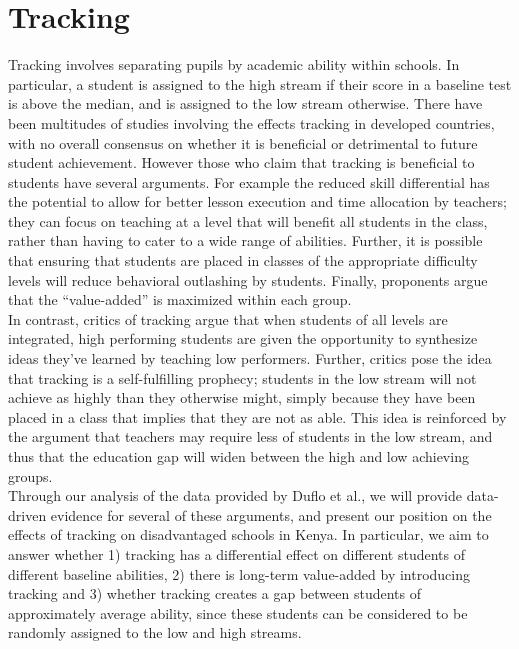 \documentclass[11pt]{article}
\begin{document}
\section{Tracking}
Tracking involves separating pupils by academic ability within schools. In particular, a student is assigned to the high stream if their score in a baseline test is above the median, and is assigned to the low stream otherwise. There have been multitudes of studies involving the effects tracking in developed countries, with no overall consensus on whether it is beneficial or detrimental to future student achievement. However those who claim that tracking is beneficial to students have several arguments. For example the reduced skill differential has the potential to allow for better lesson execution and time allocation by teachers; they can focus on teaching at a level that will benefit all students in the class, rather than having to cater to a wide range of abilities. Further, it is possible that ensuring that students are placed in classes of the appropriate difficulty levels will reduce behavioral outlashing by students. Finally, proponents argue that the ``value-added'' is maximized within each group.\\

In contrast, critics of tracking argue that when students of all levels are integrated, high performing students are given the opportunity to synthesize ideas they've learned by teaching low performers. Further, critics pose the idea that tracking is a self-fulfilling prophecy; students in the low stream will not achieve as highly than they otherwise might, simply because they have been placed in a class that implies that they are not as able. This idea is reinforced by the argument that teachers may require less of students in the low stream, and thus that the education gap will widen between the high and low achieving groups.\\

Through our analysis of the data provided by Duflo et al., we will provide data-driven evidence for several of these arguments, and present our position on the effects of tracking on disadvantaged schools in Kenya. In particular, we aim to answer whether 1) tracking has a differential effect on different students of different baseline abilities, 2) there is long-term value-added by introducing tracking and 3) whether tracking creates a gap between students of approximately average ability, since these students can be considered to be randomly assigned to the low and high streams.
 
\end{document}
